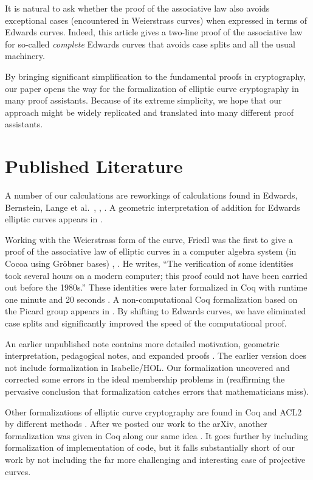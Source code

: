 \documentclass{llncs}
\begin{document}
It is natural to ask whether the proof of the associative law also
avoids exceptional cases (encountered in Weierstrass curves)
when expressed in terms of Edwards curves.
Indeed, this article gives a two-line proof of the associative law for
so-called \emph{complete} Edwards curves that avoids case splits and all
the usual machinery.

By bringing significant simplification to the fundamental proofs in
cryptography, our paper opens the way for the formalization of
elliptic curve cryptography in many proof assistants.  Because of its
extreme simplicity, we hope that our approach might be widely replicated
and translated into many different proof assistants.

\section{Published Literature}

A number of our calculations are reworkings of calculations found in
Edwards, Bernstein, Lange et al.~\cite{edwards2007normal},
\cite{bernstein2008twisted}, \cite{bernstein2007faster}.  A geometric
interpretation of addition for Edwards elliptic curves appears in
\cite{arene2011faster}.

Working with the Weierstrass form of the curve, Friedl was the first
to give a proof of the associative law of elliptic curves in a
computer algebra system (in Cocoa using Gr\"obner bases)
\cite{friedl}, \cite{friedl2017elementary}.  He writes, ``The
verification of some identities took several hours on a modern
computer; this proof could not have been carried out before the
1980s.''  These identities were later formalized in Coq with runtime one
minute and 20 seconds \cite{thery2007proving}.  A non-computational
Coq formalization based on the Picard group appears in
\cite{bartzia2014formal}.  By shifting to Edwards curves, we have
eliminated case splits and significantly improved the speed of the
computational proof.

An earlier unpublished note contains more detailed motivation,
geometric interpretation, pedagogical notes, and expanded proofs
\cite{hales2016group}.  The earlier version does not include
formalization in Isabelle/HOL.  Our formalization uncovered and
corrected some errors in the ideal membership problems in
\cite{hales2016group} (reaffirming the pervasive conclusion that
formalization catches errors that mathematicians miss).

Other formalizations of elliptic curve cryptography are found in Coq
and ACL2 by different methods \cite{russinoff2017computationally}.
After we posted our work to the arXiv, another formalization was given
in Coq along our same idea \cite{erbsen2017crafting}
\cite{erbsen2017systematic}.  It goes further by including
formalization of implementation of code, but it falls substantially
short of our work by not including the far more challenging and
interesting case of projective curves.
\end{document}
